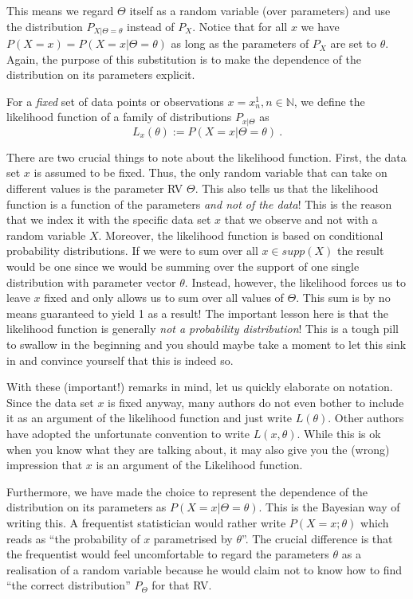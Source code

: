 This means we regard $ \Theta $ itself as a random variable (over parameters) and use the distribution $ P_{X|\Theta=\theta} $ instead of $ P_{X} $. Notice that for all
$ x $ we have $ P(X=x) = P(X=x|\Theta = \theta) $ as long as the parameters of $ P_{X} $ are set to $ \theta $. Again, the purpose of this substitution is to make
the dependence of the distribution on its parameters explicit.

\begin{Definition}\label{def:likelihood}
For a \emph{fixed} set of data points or observations $ x = x^{1}_{n}, n \in \mathbb{N} $, we define the likelihood function of a 
family of distributions $ P_{x|\Theta} $ as $$ L_{x}(\theta) := P(X=x|\Theta = \theta) \ . $$
\end{Definition}

There are two crucial things to note about the likelihood function. First, the data set $ x $ is assumed to be fixed. Thus, the only random variable that can take
on different values is the parameter RV $ \Theta $. This also tells us that the likelihood function is a function of the parameters \emph{and not of the data}! This is the reason that we index it with the
specific data set $ x $ that we observe and not with a random variable $ X $.
Moreover, the likelihood function is based on conditional probability distributions. If we were to sum over all $ x \in supp(X) $ the result would be one since 
we would be summing over the support of one single distribution with parameter vector $ \theta $. Instead, however, the likelihood forces us to leave $ x $ fixed and
only allows us to sum over all values of $ \Theta $. This sum is by no means guaranteed to yield 1 as a result! The important lesson here is that the likelihood 
function is generally \emph{not a probability distribution}! This is a tough pill to swallow in the beginning and you should maybe take a moment to let this sink in
and convince yourself that this is indeed so.

With these (important!) remarks in mind, let us quickly elaborate on notation. Since the data set $ x $ is fixed anyway, many authors do not even bother to include
it as an argument of the likelihood function and just write $ L(\theta) $. Other authors have adopted
the unfortunate convention to write $ L(x,\theta) $. While this is ok when you know what they are talking
about, it may also give you the (wrong) impression that $ x $ is an argument of the Likelihood function. 

Furthermore, we have made the choice to represent the dependence of the distribution on its
parameters as $ P(X=x|\Theta=\theta) $. This is the Bayesian way of writing this. A frequentist statistician would rather write $ P(X=x; \theta) $ which reads as
``the probability of $ x $ parametrised by $ \theta $''. The crucial difference is that the frequentist would feel uncomfortable to regard the parameters $ \theta $
as a realisation of a random variable because he would claim not to know how to find ``the correct distribution'' $ P_{\Theta} $ for that RV.

